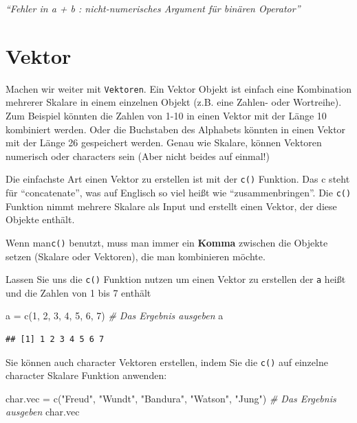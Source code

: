 \documentclass[
]{book}
\newenvironment{Shaded}{\begin{snugshade}}{\end{snugshade}}
\newcommand{\CommentTok}[1]{\textcolor[rgb]{0.56,0.35,0.01}{\textit{#1}}}
\newcommand{\DecValTok}[1]{\textcolor[rgb]{0.00,0.00,0.81}{#1}}
\newcommand{\FunctionTok}[1]{\textcolor[rgb]{0.00,0.00,0.00}{#1}}
\newcommand{\NormalTok}[1]{#1}
\newcommand{\OtherTok}[1]{\textcolor[rgb]{0.56,0.35,0.01}{#1}}
\newcommand{\StringTok}[1]{\textcolor[rgb]{0.31,0.60,0.02}{#1}}
\begin{document}
\emph{``Fehler in a + b : nicht-numerisches Argument für binären Operator''}

\hypertarget{vektor}{%
\section{Vektor}\label{vektor}}

Machen wir weiter mit \texttt{Vektoren}. Ein Vektor Objekt ist einfach eine Kombination mehrerer Skalare in einem einzelnen Objekt (z.B. eine Zahlen- oder Wortreihe).
Zum Beispiel könnten die Zahlen von 1-10 in einen Vektor mit der Länge 10 kombiniert werden. Oder die Buchstaben des Alphabets könnten in einen Vektor mit der Länge 26 gespeichert werden. Genau wie Skalare, können Vektoren numerisch oder characters sein (Aber nicht beides auf einmal!)

Die einfachste Art einen Vektor zu erstellen ist mit der \texttt{c()} Funktion. Das c steht für ``concatenate'', was auf Englisch so viel heißt wie ``zusammenbringen''. Die \texttt{c()} Funktion nimmt mehrere Skalare als Input und erstellt einen Vektor, der diese Objekte enthält.

Wenn man\texttt{c()} benutzt, muss man immer ein \textbf{Komma} zwischen die Objekte setzen (Skalare oder Vektoren), die man kombinieren möchte.

Lassen Sie uns die \texttt{c()} Funktion nutzen um einen Vektor zu erstellen der \texttt{a} heißt und die Zahlen von 1 bis 7 enthält

\begin{Shaded}
\begin{Highlighting}[]
\NormalTok{a }\OtherTok{=} \FunctionTok{c}\NormalTok{(}\DecValTok{1}\NormalTok{, }\DecValTok{2}\NormalTok{, }\DecValTok{3}\NormalTok{, }\DecValTok{4}\NormalTok{, }\DecValTok{5}\NormalTok{, }\DecValTok{6}\NormalTok{, }\DecValTok{7}\NormalTok{)}
\CommentTok{\# Das Ergebnis ausgeben}
\NormalTok{a}
\end{Highlighting}
\end{Shaded}

\begin{verbatim}
## [1] 1 2 3 4 5 6 7
\end{verbatim}

Sie können auch character Vektoren erstellen, indem Sie die \texttt{c()} auf einzelne character Skalare Funktion anwenden:

\begin{Shaded}
\begin{Highlighting}[]
\NormalTok{char.vec }\OtherTok{=} \FunctionTok{c}\NormalTok{(}\StringTok{"Freud"}\NormalTok{, }\StringTok{"Wundt"}\NormalTok{, }\StringTok{"Bandura"}\NormalTok{, }\StringTok{"Watson"}\NormalTok{, }\StringTok{"Jung"}\NormalTok{)}
\CommentTok{\# Das Ergebnis ausgeben}
\NormalTok{char.vec}
\end{Highlighting}
\end{Shaded}
\end{document}

